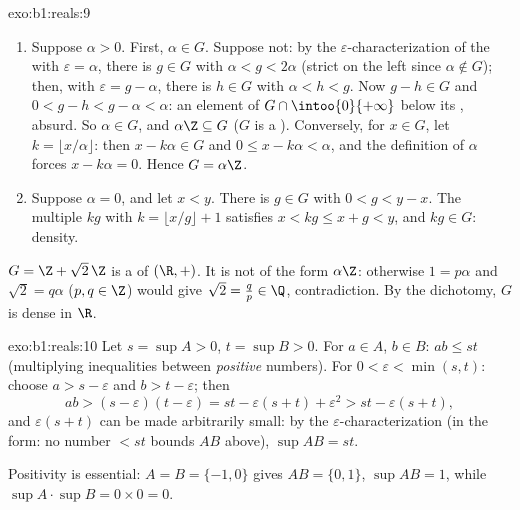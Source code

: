 \begin{solution}{exo:b1:reals:9}
\begin{enumerate}
  \item Suppose $\alpha > 0$. First, $\alpha \in G$. Suppose not: by
        the $\varepsilon$-characterization of the  with
        $\varepsilon = \alpha$, there is $g \in G$ with $\alpha < g <
        2\alpha$ (strict on the left since $\alpha \notin G$); then,
        with $\varepsilon = g - \alpha$, there is $h \in G$ with
        $\alpha < h < g$. Now $g - h \in G$ and $0 < g - h < g -
        \alpha < \alpha$: an element of $G \cap \intoo{0}{+\infty}$
        below its , absurd. So $\alpha \in G$, and $\alpha\Z
        \subseteq G$ ($G$ is a ). Conversely, for $x \in G$, let
        $k = \lfloor x/\alpha \rfloor$: then $x - k\alpha \in G$ and
        $0 \leq x - k\alpha < \alpha$, and the definition of $\alpha$
        forces $x - k\alpha = 0$. Hence $G = \alpha\Z$.
  \item Suppose $\alpha = 0$, and let $x < y$. There is $g \in G$
        with $0 < g < y - x$. The multiple $kg$ with $k = \lfloor x/g
        \rfloor + 1$ satisfies $x < kg \leq x + g < y$, and $kg \in
        G$: density.
\end{enumerate}
$G = \Z + \sqrt 2\,\Z$ is a  of $(\R, +)$. It is not of the
form $\alpha\Z$: otherwise $1 = p\alpha$ and $\sqrt 2 = q\alpha$
($p, q \in \Z$) would give $\sqrt 2 = \frac qp \in \Q$,
contradiction. By the dichotomy, $G$ is dense in $\R$.
\end{solution}

\begin{solution}{exo:b1:reals:10}
Let $s = \sup A > 0$, $t = \sup B > 0$. For $a \in A$, $b \in B$: $ab
\leq st$ (multiplying inequalities between \emph{positive} numbers).
For $0 < \varepsilon < \min(s, t)$: choose $a > s - \varepsilon$ and
$b > t - \varepsilon$; then
\[
ab > (s - \varepsilon)(t - \varepsilon)
= st - \varepsilon(s + t) + \varepsilon^2
> st - \varepsilon (s + t),
\]
and $\varepsilon(s+t)$ can be made arbitrarily small: by the
$\varepsilon$-characterization (in the form: no number $< st$ bounds
$AB$ above), $\sup AB = st$.

Positivity is essential: $A = B = \{-1, 0\}$ gives $AB = \{0, 1\}$,
$\sup AB = 1$, while $\sup A \cdot \sup B = 0 \times 0 = 0$.
\end{solution}

